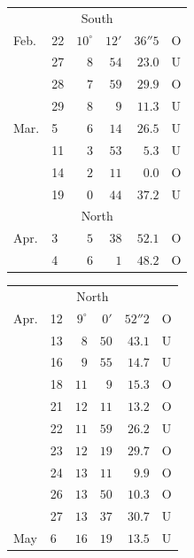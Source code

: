 \begin{center}
\begin{tabular}{ll|r r r l}
\multicolumn{6}{c}{South} \\
Feb. & 22 & $10^\circ$ & $12'$ & $36''5$ & O \\
 & 27 & $8$ & $54$ & $23.0$ & U \\
 & 28 & $7$ & $59$ & $29.9$ & O \\
 & 29 & $8$ & $9$ & $11.3$ & U \\
Mar. & 5 & $6$ & $14$ & $26.5$ & U \\
 & 11 & $3$ & $53$ & $5.3$ & U \\
 & 14 & $2$ & $11$ & $0.0$ & O \\
 & 19 & $0$ & $44$ & $37.2$ & U \\
\multicolumn{6}{c}{North} \\
Apr. & 3 & $5$ & $38$ & $52.1$ & O \\
 & 4 & $6$ & $1$ & $48.2$ & O \\
\end{tabular}
\end{center}

\begin{center}
\begin{tabular}{ll|r r r l}
\multicolumn{6}{c}{North} \\
Apr. & 12 & $9^\circ$ & $0'$ & $52''2$ & O \\
 & 13 & $8$ & $50$ & $43.1$ & U \\
 & 16 & $9$ & $55$ & $14.7$ & U \\
 & 18 & $11$ & $9$ & $15.3$ & O \\
 & 21 & $12$ & $11$ & $13.2$ & O \\
 & 22 & $11$ & $59$ & $26.2$ & U \\
 & 23 & $12$ & $19$ & $29.7$ & O \\
 & 24 & $13$ & $11$ & $9.9$ & O \\
 & 26 & $13$ & $50$ & $10.3$ & O \\
 & 27 & $13$ & $37$ & $30.7$ & U \\
May & 6 & $16$ & $19$ & $13.5$ & U \\
\end{tabular}
\end{center}

